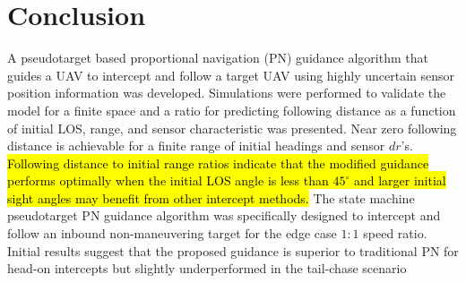 \documentclass[conference]{IEEEtran}
\begin{document}
\section{Conclusion}





A pseudotarget based proportional navigation (PN) guidance algorithm that guides a UAV to intercept and follow a target UAV using highly uncertain sensor position information was developed. Simulations were performed to validate the model for a finite space and a ratio for predicting following distance as a function of initial LOS, range, and sensor characteristic was presented. Near zero following distance is achievable for a finite range of initial headings and sensor $dr$'s. \hl{Following distance to initial range ratios indicate that the modified guidance performs optimally when the initial LOS angle is less than $45^\circ$ and larger initial sight angles may benefit from other intercept methods.} The state machine pseudotarget PN guidance algorithm was specifically designed to intercept and follow an inbound non-maneuvering target for the edge case $1:1$ speed ratio. Initial results suggest that the proposed guidance is superior to traditional PN for head-on intercepts but slightly underperformed in the tail-chase scenario 
\end{document}
